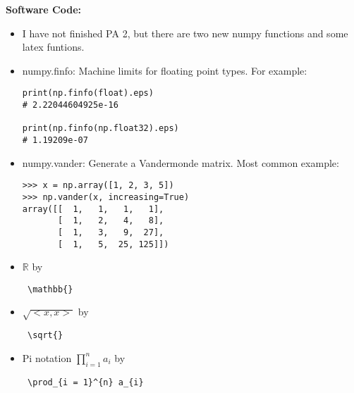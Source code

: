 \documentclass{article}
\begin{document}
\textbf{Software Code:}
\begin{itemize}
\item I have not finished PA 2, but there are two new numpy functions and some latex funtions.
\item numpy.finfo: Machine limits for floating point types. For example:
\begin{verbatim}
print(np.finfo(float).eps)
# 2.22044604925e-16

print(np.finfo(np.float32).eps)
# 1.19209e-07    
\end{verbatim}

\item numpy.vander: Generate a Vandermonde matrix. Most common example:
\begin{verbatim}
>>> x = np.array([1, 2, 3, 5])
>>> np.vander(x, increasing=True)
array([[  1,   1,   1,   1],
       [  1,   2,   4,   8],
       [  1,   3,   9,  27],
       [  1,   5,  25, 125]])    
\end{verbatim}
\item $\mathbb{R}$ by  \begin{verbatim} \mathbb{}  \end{verbatim} 
\item $\sqrt{<x,x>} $  by \begin{verbatim} \sqrt{} \end{verbatim} 
\item Pi notation $\prod_{i = 1}^{n} a_{i}$ by \begin{verbatim} \prod_{i = 1}^{n} a_{i} \end{verbatim}
\end{itemize}
\end{document}
